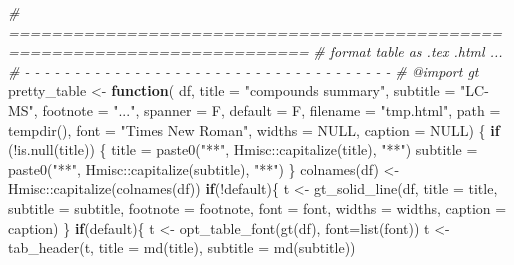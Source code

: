 \documentclass[
]{article}
\newenvironment{Shaded}{\begin{snugshade}}{\end{snugshade}}
\newcommand{\AttributeTok}[1]{\textcolor[rgb]{0.77,0.63,0.00}{#1}}
\newcommand{\CommentTok}[1]{\textcolor[rgb]{0.56,0.35,0.01}{\textit{#1}}}
\newcommand{\ConstantTok}[1]{\textcolor[rgb]{0.00,0.00,0.00}{#1}}
\newcommand{\ControlFlowTok}[1]{\textcolor[rgb]{0.13,0.29,0.53}{\textbf{#1}}}
\newcommand{\FunctionTok}[1]{\textcolor[rgb]{0.00,0.00,0.00}{#1}}
\newcommand{\NormalTok}[1]{#1}
\newcommand{\OtherTok}[1]{\textcolor[rgb]{0.56,0.35,0.01}{#1}}
\newcommand{\SpecialCharTok}[1]{\textcolor[rgb]{0.00,0.00,0.00}{#1}}
\newcommand{\StringTok}[1]{\textcolor[rgb]{0.31,0.60,0.02}{#1}}
\begin{document}
\begin{Shaded}
\begin{Highlighting}[]
\CommentTok{\# ==========================================================================}
\CommentTok{\# format table as .tex .html ...}
\CommentTok{\# {-} {-} {-} {-} {-} {-} {-} {-} {-} {-} {-} {-} {-} {-} {-} {-} {-} {-} {-} {-} {-} {-} {-} {-} {-} {-} {-} {-} {-} {-} {-} {-} {-} {-} {-} {-} {-}}
\CommentTok{\#\textquotesingle{} @import gt}
\NormalTok{pretty\_table }\OtherTok{\textless{}{-}} 
  \ControlFlowTok{function}\NormalTok{(}
\NormalTok{    df, }\AttributeTok{title =} \StringTok{"compounds summary"}\NormalTok{, }\AttributeTok{subtitle =} \StringTok{"LC{-}MS"}\NormalTok{,}
    \AttributeTok{footnote =} \StringTok{"..."}\NormalTok{, }\AttributeTok{spanner =}\NormalTok{ F, }\AttributeTok{default =}\NormalTok{ F,}
    \AttributeTok{filename =} \StringTok{"tmp.html"}\NormalTok{, }\AttributeTok{path =} \FunctionTok{tempdir}\NormalTok{(),}
    \AttributeTok{font =} \StringTok{"Times New Roman"}\NormalTok{, }\AttributeTok{widths =} \ConstantTok{NULL}\NormalTok{, }\AttributeTok{caption =} \ConstantTok{NULL}\NormalTok{)}
\NormalTok{  \{}
    \ControlFlowTok{if}\NormalTok{ (}\SpecialCharTok{!}\FunctionTok{is.null}\NormalTok{(title)) \{}
\NormalTok{      title }\OtherTok{=} \FunctionTok{paste0}\NormalTok{(}\StringTok{"**"}\NormalTok{, Hmisc}\SpecialCharTok{::}\FunctionTok{capitalize}\NormalTok{(title), }\StringTok{"**"}\NormalTok{)}
\NormalTok{      subtitle }\OtherTok{=} \FunctionTok{paste0}\NormalTok{(}\StringTok{"**"}\NormalTok{, Hmisc}\SpecialCharTok{::}\FunctionTok{capitalize}\NormalTok{(subtitle), }\StringTok{"**"}\NormalTok{)}
\NormalTok{    \}}
    \FunctionTok{colnames}\NormalTok{(df) }\OtherTok{\textless{}{-}}\NormalTok{ Hmisc}\SpecialCharTok{::}\FunctionTok{capitalize}\NormalTok{(}\FunctionTok{colnames}\NormalTok{(df))}
    \ControlFlowTok{if}\NormalTok{(}\SpecialCharTok{!}\NormalTok{default)\{}
\NormalTok{      t }\OtherTok{\textless{}{-}} \FunctionTok{gt\_solid\_line}\NormalTok{(df, }\AttributeTok{title =}\NormalTok{ title, }\AttributeTok{subtitle =}\NormalTok{ subtitle,}
        \AttributeTok{footnote =}\NormalTok{ footnote, }\AttributeTok{font =}\NormalTok{ font, }\AttributeTok{widths =}\NormalTok{ widths, }\AttributeTok{caption =}\NormalTok{ caption)}
\NormalTok{    \}}
    \ControlFlowTok{if}\NormalTok{(default)\{}
\NormalTok{      t }\OtherTok{\textless{}{-}} \FunctionTok{opt\_table\_font}\NormalTok{(}\FunctionTok{gt}\NormalTok{(df), }\AttributeTok{font=}\FunctionTok{list}\NormalTok{(font))}
\NormalTok{      t }\OtherTok{\textless{}{-}} \FunctionTok{tab\_header}\NormalTok{(t, }\AttributeTok{title =} \FunctionTok{md}\NormalTok{(title), }\AttributeTok{subtitle =} \FunctionTok{md}\NormalTok{(subtitle))}

\end{Highlighting}
\end{Shaded}
\end{document}
